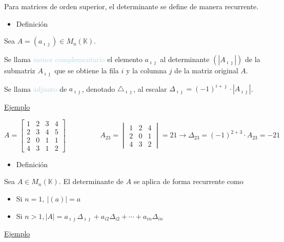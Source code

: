 \documentclass[12pt]{article}
\begin{document}
Para matrices de orden superior, el determinante se define de
manera recurrente.

\begin{itemize}[label=\color{red}\textbullet, leftmargin=*]
    \item \color{lightblue} Definición
\end{itemize}

Sea $A=\left(a_{\imath\jmath  }\right)\in M_n(\mathbb{K})$.

Se llama \textcolor{lightblue}{menor complementario} el elemento
$a_{\imath\jmath  }$ al determinante $\left(\left|A_{\imath\jmath  }\right|\right)$ de
la submatriz $A_{\imath\jmath  }$ que se obtiene la fila $i$ y la columna
$j$ de la matriz original $A$.

Se llama \textcolor{lightblue}{adjunto} de $a_{\imath\jmath  }$, denotado
$\triangle_{\imath\jmath  }$, al escalar
$\Delta_{\imath\jmath  }=(-1)^{i+\jmath }\cdot|A_{\imath\jmath  }|$.

\underline{Ejemplo}

\renewcommand{\arraystretch}{1}
\setlength{\arraycolsep}{10pt}

$A=\begin{bmatrix}
1 & 2 & 3 & 4 \\ 
2 & 3 & 4 & 5 \\ 
2 & 0 & 1 & 1 \\ 
4 & 3 & 1 & 2
\end{bmatrix}\hspace{2cm}A_{23}=\begin{vmatrix}
1 & 2 & 4 \\ 
2 & 0 & 1 \\ 
4 & 3 & 2
\end{vmatrix}=21\longrightarrow\Delta_{23}=(-1)^{2+3}\cdot
A_{23}=-21$

\begin{itemize}[label=\color{red}\textbullet, leftmargin=*]
    \item \color{lightblue}Definición
\end{itemize}
Sea $A\in M_n(\mathbb{K})$. El determinante de $A$ se aplica de
forma recurrente como
\begin{itemize}
\item Si $n=1,~|(a)|=a$
\item Si
$n>1,|A|=a_{\imath\jmath  }\Delta_{\imath\jmath  }+a_{i2}\Delta_{i2}+\cdots+a_{in}\Delta_{in}$
\end{itemize}

\underline{Ejemplo}
\end{document}
